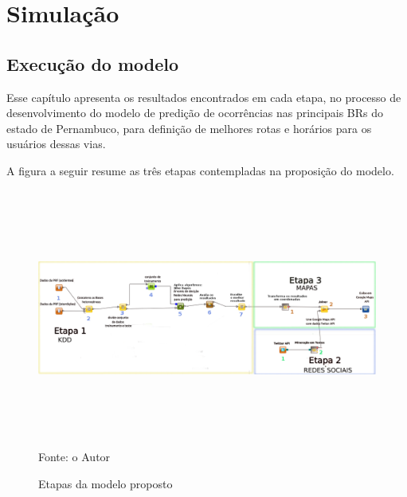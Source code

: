 \chapter{Simulação}\label{simula}

\section{Execução do modelo}

Esse capítulo apresenta os resultados encontrados em cada etapa, no processo de desenvolvimento do modelo de predição de ocorrências nas principais BRs do estado de Pernambuco, para definição de melhores rotas e horários para os usuários dessas vias.

\vspace{5mm}

A figura a seguir resume as três etapas contempladas na proposição do modelo.

\begin{figure}[ht]
\centering
\caption{Etapas da modelo proposto}
\includegraphics[width=175mm, height=85mm]{Figuras/Cronograma/metodologia.png}\\
\tiny Fonte: o Autor
\end{figure}

